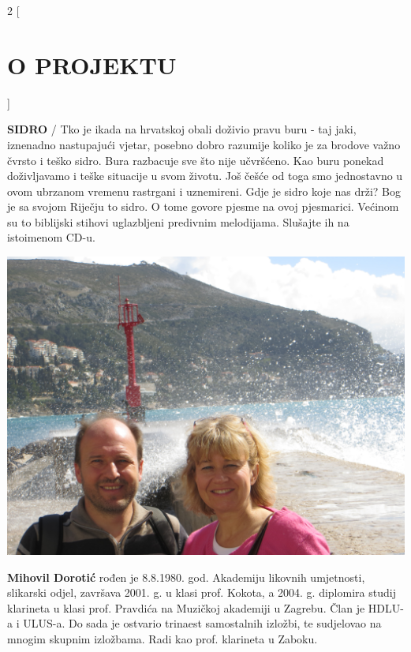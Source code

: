 \documentclass[a4paper,twoside, svgnames]{article}
\begin{document}
\newpage
\begin{multicols}{2}
[
\section*{O PROJEKTU}
]
    \begin{onehalfspacing}
        \begin{justify}
\textbf{SIDRO} / Tko je ikada na hrvatskoj obali doživio pravu buru -  taj jaki, iznenadno nastupajući vjetar, posebno dobro razumije koliko je za brodove važno čvrsto i teško sidro. Bura razbacuje sve što nije učvršćeno. Kao buru ponekad doživljavamo i teške situacije  u svom životu. Još češće od toga smo jednostavno u ovom ubrzanom vremenu rastrgani i uznemireni.
Gdje je sidro koje nas drži?
Bog je sa svojom Riječju to sidro. O tome govore pjesme na ovoj pjesmarici. Većinom su to  biblijski stihovi uglazbljeni predivnim melodijama. Slušajte ih na istoimenom CD-u.

\begin{center}
\includegraphics[width=\linewidth]{images/IMG_1216}
\end{center}
\textbf{Mihovil Dorotić} rođen je 8.8.1980. god. Akademiju likovnih umjetnosti, slikarski odjel, završava 2001. g. u klasi prof. Kokota, a 2004. g. diplomira studij klarineta u klasi prof. Pravdića  na Muzičkoj akademiji u Zagrebu. Član je HDLU-a i ULUS-a. Do sada je ostvario trinaest samostalnih izložbi, te sudjelovao na mnogim skupnim izložbama. Radi kao prof. klarineta u Zaboku.


\end{justify}
\end{onehalfspacing}
\end{multicols}
\end{document}
